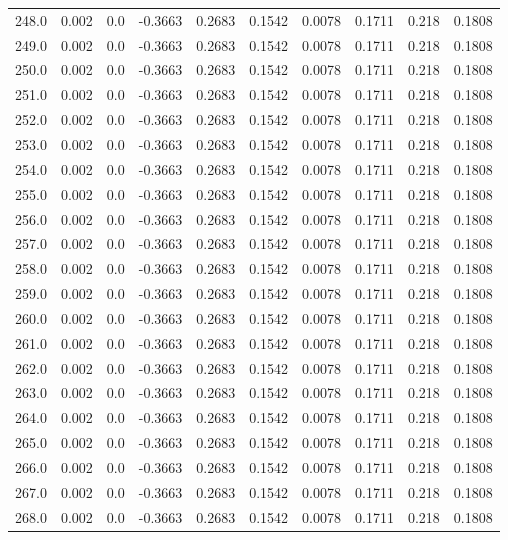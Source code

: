 \begin{longtable}{lrrrrrrrrr}
248.0 & 0.002 & 0.0 & -0.3663 & 0.2683 & 0.1542 & 0.0078 & 0.1711 & 0.218 & 0.1808 \\
249.0 & 0.002 & 0.0 & -0.3663 & 0.2683 & 0.1542 & 0.0078 & 0.1711 & 0.218 & 0.1808 \\
250.0 & 0.002 & 0.0 & -0.3663 & 0.2683 & 0.1542 & 0.0078 & 0.1711 & 0.218 & 0.1808 \\
251.0 & 0.002 & 0.0 & -0.3663 & 0.2683 & 0.1542 & 0.0078 & 0.1711 & 0.218 & 0.1808 \\
252.0 & 0.002 & 0.0 & -0.3663 & 0.2683 & 0.1542 & 0.0078 & 0.1711 & 0.218 & 0.1808 \\
253.0 & 0.002 & 0.0 & -0.3663 & 0.2683 & 0.1542 & 0.0078 & 0.1711 & 0.218 & 0.1808 \\
254.0 & 0.002 & 0.0 & -0.3663 & 0.2683 & 0.1542 & 0.0078 & 0.1711 & 0.218 & 0.1808 \\
255.0 & 0.002 & 0.0 & -0.3663 & 0.2683 & 0.1542 & 0.0078 & 0.1711 & 0.218 & 0.1808 \\
256.0 & 0.002 & 0.0 & -0.3663 & 0.2683 & 0.1542 & 0.0078 & 0.1711 & 0.218 & 0.1808 \\
257.0 & 0.002 & 0.0 & -0.3663 & 0.2683 & 0.1542 & 0.0078 & 0.1711 & 0.218 & 0.1808 \\
258.0 & 0.002 & 0.0 & -0.3663 & 0.2683 & 0.1542 & 0.0078 & 0.1711 & 0.218 & 0.1808 \\
259.0 & 0.002 & 0.0 & -0.3663 & 0.2683 & 0.1542 & 0.0078 & 0.1711 & 0.218 & 0.1808 \\
260.0 & 0.002 & 0.0 & -0.3663 & 0.2683 & 0.1542 & 0.0078 & 0.1711 & 0.218 & 0.1808 \\
261.0 & 0.002 & 0.0 & -0.3663 & 0.2683 & 0.1542 & 0.0078 & 0.1711 & 0.218 & 0.1808 \\
262.0 & 0.002 & 0.0 & -0.3663 & 0.2683 & 0.1542 & 0.0078 & 0.1711 & 0.218 & 0.1808 \\
263.0 & 0.002 & 0.0 & -0.3663 & 0.2683 & 0.1542 & 0.0078 & 0.1711 & 0.218 & 0.1808 \\
264.0 & 0.002 & 0.0 & -0.3663 & 0.2683 & 0.1542 & 0.0078 & 0.1711 & 0.218 & 0.1808 \\
265.0 & 0.002 & 0.0 & -0.3663 & 0.2683 & 0.1542 & 0.0078 & 0.1711 & 0.218 & 0.1808 \\
266.0 & 0.002 & 0.0 & -0.3663 & 0.2683 & 0.1542 & 0.0078 & 0.1711 & 0.218 & 0.1808 \\
267.0 & 0.002 & 0.0 & -0.3663 & 0.2683 & 0.1542 & 0.0078 & 0.1711 & 0.218 & 0.1808 \\
268.0 & 0.002 & 0.0 & -0.3663 & 0.2683 & 0.1542 & 0.0078 & 0.1711 & 0.218 & 0.1808 \\

\end{longtable}
